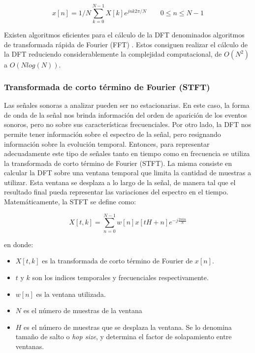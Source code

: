 \begin{equation}
\label{eqn:furier2}
	x[n] = {1}/{N}\sum_{k=0}^{N-1} X[k]e^{jnk2\pi/N} \qquad  0\leq n \leq N-1
\end{equation} 

Existen algoritmos eficientes para el cálculo de la DFT denominados algoritmos de transformada rápida de Fourier (FFT) \cite{fft}. Estos consiguen realizar el cálculo de la DFT reduciendo considerablemente la complejidad computacional, de $O(N^{2})$ a $O(Nlog(N))$.

\subsubsection{Transformada de corto término de Fourier (STFT)}

Las señales sonoras a analizar pueden ser no estacionarias. En este caso, la forma de onda de la señal nos brinda información del orden de aparición de los eventos sonoros, pero no sobre sus características frecuenciales. Por otro lado, la DFT nos permite tener información sobre el espectro de la señal, pero resignando información sobre la evolución temporal. Entonces, para representar adecuadamente este tipo de señales tanto en tiempo como en frecuencia se utiliza la transformada de corto término de Fourier (STFT). La misma consiste en calcular la DFT sobre una ventana temporal que limita la cantidad de muestras a utilizar. Esta ventana se desplaza a lo largo de la señal, de manera tal que el resultado final pueda representar las variaciones del espectro en el tiempo. Matemáticamente, la STFT se define como: 

\begin{equation}
\label{eqn:STFT}
	X[t,k] = \sum_{n = 0}^{N-1}w[n]x[tH+n]e^{-j\frac{2 \pi k n}{N}}
\end{equation}

en donde:

\begin{itemize}
    \item $X[t,k]$ es la transformada de corto término de Fourier de $x[n]$.
    \item $t$ y $k$ son los indices temporales y frecuenciales respectivamente.
    \item $w[n]$ es la ventana utilizada.
    \item $N$ es el número de muestras de la ventana
    \item $H$ es el número de muestras que se desplaza la ventana. Se lo denomina tamaño de salto o \textit{hop size}, y determina el factor de solapamiento entre ventanas. 
\end{itemize}

